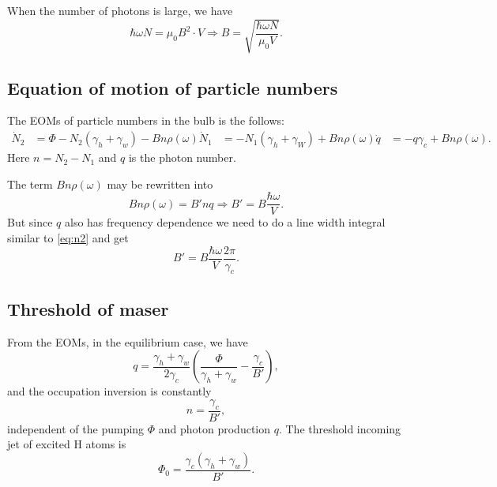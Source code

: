 \documentclass[hyperref, a4paper]{article}
\def\\{}%
\begin{document}
When the number of photons is large, we have 
\begin{equation}
    \hbar \omega N = \mu_0 B^2 \cdot V \Rightarrow B = \sqrt{\frac{\hbar \omega N}{\mu_0 V}}.
\end{equation}

\subsection{Equation of motion of particle numbers}

The EOMs of particle numbers in the bulb is the follows:
\begin{equation}
    \begin{aligned} 
        \dot{N}_2 & =\Phi-N_2\left(\gamma_h+\gamma_w\right)-B n \rho(\omega) \\ \dot{N}_1 & =-N_1\left(\gamma_h+\gamma_W\right)+B n \rho(\omega) \\ \dot{q} & =-q \gamma_c+B n \rho(\omega).
    \end{aligned}
\end{equation}
Here $n = N_2 - N_1$ and $q$ is the photon number.

The term $B n \rho(\omega)$ may be rewritten into 
\begin{equation}
    B n \rho(\omega) = B' n q \Rightarrow B' = B \frac{\hbar \omega}{V}.
\end{equation}
But since $q$ also has frequency dependence 
we need to do a line width integral similar to \eqref{eq:n2}
and get 
\begin{equation}
    B' = B \frac{\hbar \omega}{V} \frac{2\pi}{\gamma_c}.
\end{equation}

\subsection{Threshold of maser}

From the EOMs, in the equilibrium case, we have 
\begin{equation}
    q = \frac{\gamma_h + \gamma_w}{2 \gamma_c} \left(
        \frac{\Phi}{\gamma_h + \gamma_w} - \frac{\gamma_c}{B'}
    \right),
\end{equation}
and the occupation inversion is constantly
\begin{equation}
    n = \frac{\gamma_c}{B'},
\end{equation} 
independent of the pumping $\Phi$ and photon production $q$.
The threshold incoming jet of excited H atoms is 
\begin{equation}
    \Phi_0 = \frac{\gamma_c (\gamma_h + \gamma_w)}{B'}.
\end{equation}
\end{document}
